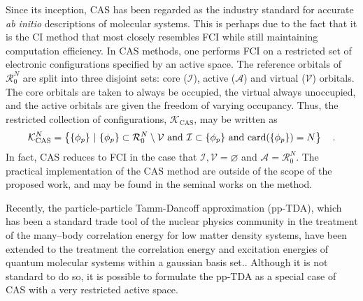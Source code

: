 Since its inception, CAS has been regarded as the industry standard for accurate
\emph{ab initio} descriptions of molecular systems. This is perhaps due to the
fact that it is the CI method that most closely resembles FCI while still
maintaining computation efficiency. In CAS methods, one performs FCI on a
restricted set of electronic configurations specified by an active space. The
reference orbitals of $\mathcal{R}^N_0$ are split into three disjoint sets: core 
($\mathcal{I}$), active ($\mathcal{A}$) and virtual ($\mathcal{V}$) orbitals.
The core orbitals are taken to always be occupied, the virtual always
unoccupied, and the active orbitals are given the freedom of varying occupancy.
Thus, the restricted collection of configurations, $\mathcal{K}_\mathrm{CAS}$,
may be written as
\begin{equation}
\mathcal{K}^N_\mathrm{CAS} = 
\left\lbrace \{ \phi_p \} \text{ }\vert\text{ } 
\{ \phi_p \} \subset \mathcal{R}^N_0 \setminus \mathcal{V} \text{ and } 
\mathcal{I} \subset \{ \phi_p \} \text{ and }
\mathrm{card}(\{ \phi_p \}) = N \right\rbrace
\quad. \label{eq:CASAnsatz}
\end{equation}
In fact, CAS reduces to FCI in the case that 
$\mathcal{I},\mathcal{V} = \varnothing$ and $\mathcal{A} = \mathcal{R}_0^N$.
The practical implementation of the CAS method are outside of the scope of the
proposed work, and may be found in the seminal works on the method.


Recently, the particle-particle Tamm-Dancoff approximation (pp-TDA), which has
been a standard trade tool of the nuclear physics community in the treatment of
the many--body correlation energy for low matter density
systems\cite{SchuckBook_04}, have been extended to the treatment the correlation
energy and excitation energies of quantum molecular systems within a gaussian 
basis set.\cite{Yang13_224105,Yang13_18A522,
Yang13_174110,Yang13_104112,Yang13_030501,Yang09_066403,Bulik13_104113}.
Although it is not standard to do so, it is possible to formulate the pp-TDA as
a special case of CAS with a very restricted active space.

